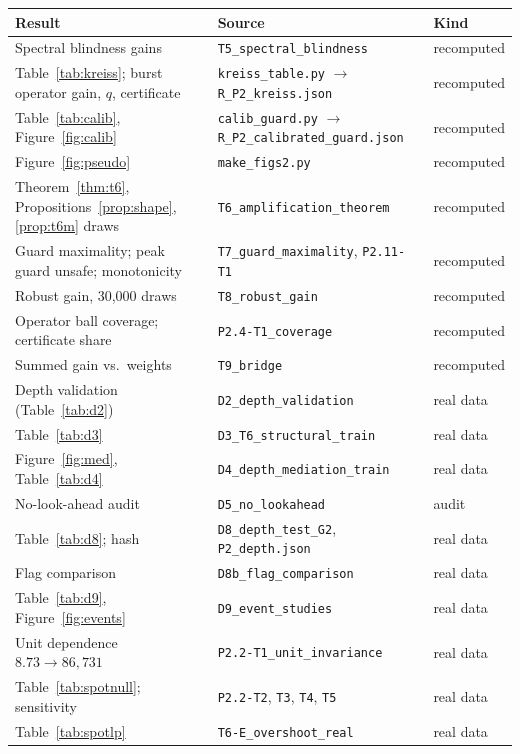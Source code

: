 \begin{longtable}{p{}p{}p{}}
\toprule
Result & Source & Kind\\
\midrule
\endhead
Spectral blindness gains & \texttt{T5\_spectral\_blindness} & recomputed\\
Table~\ref{tab:kreiss}; burst operator gain, $q$, certificate & \texttt{kreiss\_table.py} $\to$ \texttt{R\_P2\_kreiss.json} & recomputed\\
Table~\ref{tab:calib}, Figure~\ref{fig:calib} & \texttt{calib\_guard.py} $\to$ \texttt{R\_P2\_calibrated\_guard.json} & recomputed\\
Figure~\ref{fig:pseudo} & \texttt{make\_figs2.py} & recomputed\\
Theorem~\ref{thm:t6}, Propositions~\ref{prop:shape}, \ref{prop:t6m} draws & \texttt{T6\_amplification\_theorem} & recomputed\\
Guard maximality; peak guard unsafe; monotonicity & \texttt{T7\_guard\_maximality}, \texttt{P2.11-T1} & recomputed\\
Robust gain, 30,000 draws & \texttt{T8\_robust\_gain} & recomputed\\
Operator ball coverage; certificate share & \texttt{P2.4-T1\_coverage} & recomputed\\
Summed gain vs.\ weights & \texttt{T9\_bridge} & recomputed\\
Depth validation (Table~\ref{tab:d2}) & \texttt{D2\_depth\_validation} & real data\\
Table~\ref{tab:d3} & \texttt{D3\_T6\_structural\_train} & real data\\
Figure~\ref{fig:med}, Table~\ref{tab:d4} & \texttt{D4\_depth\_mediation\_train} & real data\\
No-look-ahead audit & \texttt{D5\_no\_lookahead} & audit\\
Table~\ref{tab:d8}; hash & \texttt{D8\_depth\_test\_G2}, \texttt{P2\_depth.json} & real data\\
Flag comparison & \texttt{D8b\_flag\_comparison} & real data\\
Table~\ref{tab:d9}, Figure~\ref{fig:events} & \texttt{D9\_event\_studies} & real data\\
Unit dependence $8.73\to86{,}731$ & \texttt{P2.2-T1\_unit\_invariance} & real data\\
Table~\ref{tab:spotnull}; sensitivity & \texttt{P2.2-T2}, \texttt{T3}, \texttt{T4}, \texttt{T5} & real data\\
Table~\ref{tab:spotlp} & \texttt{T6-E\_overshoot\_real} & real data\\

\end{longtable}
